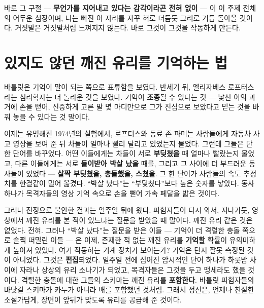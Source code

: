 바로 그 구절 — \textbf{무언가를 지어내고 있다는 감각이라곤 전혀 없이} — 이 이 주제 전체의 어두운 심장이며, 나는 빠진 이 자리를 자꾸 혀로 더듬듯 그리로 거듭 돌아올 것이다. 거짓말은 거짓말처럼 느껴지지 않는다. 바로 그것이 그것을 작동하게 만든다.

\section*{있지도 않던 깨진 유리를 기억하는 법}

바틀릿은 기억이 말이 되는 쪽으로 표류함을 보였다. 반세기 뒤, 엘리자베스 로프터스라는 심리학자는 더 놀라운 것을 보였다. 기억이 \textbf{조종}될 수 있다는 것 — 낯선 이의 과거에 손을 뻗어, 신중하게 고른 말 몇 마디만으로 그가 진심으로 보았다고 믿는 것을 바꿔 놓을 수 있다는 것 말이다.

이제는 유명해진 1974년의 실험에서, 로프터스와 동료 존 파머는 사람들에게 자동차 사고 영상을 보여 준 뒤 차들이 얼마나 빨리 달리고 있었는지 물었다. 그런데 그들은 단 한 단어를 바꾸었다. 어떤 이들에게는 차들이 서로 \textbf{부딪쳤을} 때 얼마나 빨랐는지 물었고, 다른 이들에게는 서로 \textbf{들이받아 박살 났을} 때를, 그리고 그 사이에 더 부드러운 동사들이 있었다 — \textbf{살짝 부딪쳤을, 충돌했을, 스쳤을}. 그 한 단어가 사람들의 속도 추정치를 한결같이 밀어 옮겼다. ``박살 났다''는 ``부딪쳤다''보다 높은 숫자를 낳았다. 동사 하나가 목격자들의 영상 기억 속으로 손을 뻗어 가속 페달을 밟은 것이다.

그러나 진정으로 불안한 결과는 일주일 뒤에 왔다. 피험자들이 다시 와서, 지나가듯, 영상에서 깨진 유리를 본 적이 있느냐는 질문을 받았을 때 말이다. 깨진 유리 같은 것은 없었다. 전혀. 그러나 ``박살 났다''는 질문을 받은 이들 — 기억이 더 격렬한 충돌 쪽으로 슬쩍 떠밀린 이들 — 은 이제, 존재한 적 없는 깨진 유리를 \textbf{기억할} 확률이 유의미하게 높아져 있었다. 여기 작동하는 기계 장치가 보이는가? 기억은 단지 잘못 측정된 것이 아니었다. 그것은 \textbf{편집}되었다. 일주일 전에 심어진 암시적인 단어 하나가 하룻밤 사이에 자라나 상상의 유리 소나기가 되었고, 목격자들은 그것을 두고 맹세라도 했을 것이다. 격렬한 충돌에 대한 그들의 스키마는 깨진 유리를 \textbf{포함한다}. 바틀릿 피험자들의 바닷길 스키마가 카누가 아니라 배를 포함했던 것처럼. 그래서 정신은, 언제나 친절한 소설가답게, 장면이 앞뒤가 맞도록 유리를 공급해 준 것이다.

